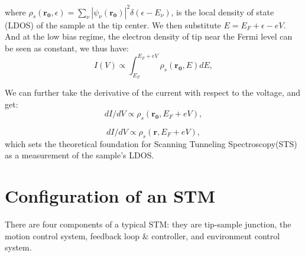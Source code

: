 where $\rho_s(\mathbf{r_0},\epsilon) = \sum_{\nu} |\psi_{\nu}(\mathbf{r_0})|^2 \delta(\epsilon - E_{\nu})$, is the local density of state (LDOS) of the sample at the tip center. We then substitute $E = E_F+ \epsilon - eV$. And at the low bias regime, the electron density of tip near the Fermi level can be seen as constant, we thus have: 
\begin{equation}
	I(V) \propto \int_{E_F}^{E_F+ eV}  \rho_s(\mathbf{r_0},E) dE,
\end{equation}

We can further take the derivative of the current with respect to the voltage, and get: 
\begin{equation}
	dI/dV \propto \rho_s(\mathbf{r_0},E_F + eV),
\end{equation}

\begin{equation}
	dI/dV \propto \rho_s(\mathbf{r},E_F + eV),
\end{equation}
which sets the theoretical foundation for Scanning Tunneling Spectroscopy(STS) as a measurement of the sample's \ac{LDOS}. 

\section{Configuration of an STM}
There are four components of a typical STM: they are tip-sample junction, the motion control system, feedback loop $\&$ controller, and environment control system. 

